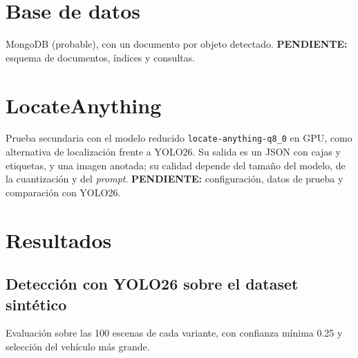 \documentclass[11pt,a4paper]{article}
\newcommand{\pend}[1]{\textbf{PENDIENTE:} #1}
\begin{document}
\section{Base de datos}

MongoDB (probable), con un documento por objeto detectado.
\pend{esquema de documentos, \'indices y consultas.}

\section{LocateAnything}

Prueba secundaria con el modelo reducido \texttt{locate-anything-q8\_0} en GPU, como
alternativa de localizaci\'on frente a YOLO26. Su salida es un JSON con cajas y etiquetas,
y una imagen anotada; su calidad depende del tama\~no del modelo, de la cuantizaci\'on y del
\emph{prompt}.
\pend{configuraci\'on, datos de prueba y comparaci\'on con YOLO26.}

\section{Resultados}

\subsection{Detecci\'on con YOLO26 sobre el dataset sint\'etico}

Evaluaci\'on sobre las 100 escenas de cada variante, con confianza m\'inima 0.25 y
selecci\'on del veh\'iculo m\'as grande.

\begin{table}[ht]
\centering
\small
{}
\caption{Resultados de detecci\'on. ``Extra'' es la media de detecciones adicionales por
imagen; ``ms'' es la inferencia media por imagen.}
\end{table}
\end{document}
